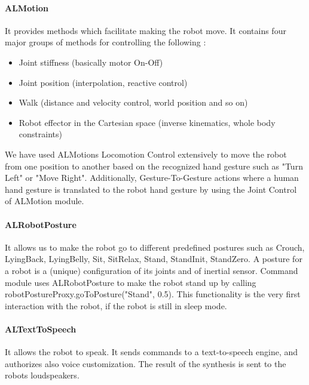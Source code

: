 \paragraph*{ALMotion} It provides methods which facilitate making the robot move. It contains four major groups of methods for controlling the following :

\begin{itemize}
	\item Joint stiffness (basically motor On-Off)
	\item Joint position (interpolation, reactive control)
	\item Walk (distance and velocity control, world position and so on)
	\item Robot effector in the Cartesian space (inverse kinematics, whole body constraints)
\end{itemize}

We have used ALMotions Locomotion Control extensively to move the robot from one position to another based on the recognized hand gesture such as "Turn Left" or "Move Right". Additionally, Gesture-To-Gesture actions where a human hand gesture is translated to the robot hand gesture by using the Joint Control of ALMotion module.

\paragraph*{ALRobotPosture} It allows us to make the robot go to different predefined postures such as  Crouch, LyingBack, LyingBelly, Sit, SitRelax, Stand, StandInit, StandZero. A posture for a robot is a (unique) configuration of its joints and of inertial sensor. Command module uses ALRobotPosture to make the robot stand up by calling robotPostureProxy.goToPosture("Stand", 0.5). This functionality is the very first interaction with the robot, if the robot is still in sleep mode. 

\paragraph*{ALTextToSpeech} It allows the robot to speak. It sends commands to a text-to-speech engine, and authorizes also voice customization. The result of the synthesis is sent to the robots loudspeakers.
